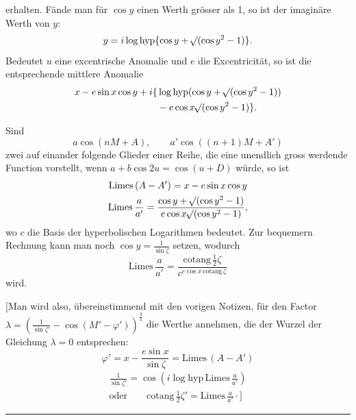 erhalten. Fände man für \(\cos y\) einen Werth grösser als 1, so ist der imaginäre
Werth von \(y\):
\[
y=i\log\mathrm{hyp}\{\cos y+\mathord{{}^{}\!\surd}(\cos y^2-1)\}.
\]
\noindent Bedeutet \(u\) eine excentrische Anomalie und \(e\) die Excentricität, so ist
die entsprechende mittlere Anomalie
\[
\begin{aligned}
x-e\sin x\cos y+i\{&\log\mathrm{hyp}(\cos y+\mathord{{}^{}\!\surd}(\cos y^2-1))\\
&-e\cos x\mathord{{}^{}\!\surd}(\cos y^2-1)\}.
\end{aligned}
\]
\par\noindent\hspace*{\parindent}Sind
\[
a\cos(nM+A),\qquad a'\cos((n+1)M+A')
\]
\noindent zwei auf einander folgende Glieder einer Reihe, die eine unendlich gross
werdende Function vorstellt, wenn \(a+b\cos2u=\cos(u+D)\) würde, so ist
\[
\begin{gathered}
\mathrm{Limes}\,(A-A')=x-e\sin x\cos y\\
\mathrm{Limes}\,\frac a{a'}=\frac{\cos y+\mathord{{}^{}\!\surd}(\cos y^2-1)}{e\cos x\mathord{{}^{}\!\surd}(\cos y^2-1)},
\end{gathered}
\]
\noindent wo \(c\) die Basis der hyperbolischen Logarithmen bedeutet. Zur bequemern
Rechnung kann man noch \(\cos y=\frac1{\sin\zeta}\) setzen, wodurch
\[
\mathrm{Limes}\,\frac a{a'}=\frac{\mathrm{cotang}\,\frac12\zeta}{c^{e\cos x\,\mathrm{cotang}\,\zeta}}
\]
\noindent wird.
\par\noindent\hspace*{\parindent}[Man wird also, übereinstimmend mit den vorigen Notizen, für den Factor
\(\lambda=\left(\frac1{\sin\zeta'}-\cos(M'-\varphi')\right)^{\frac32}\) die Werthe annehmen,
die der Wurzel der Gleichung \(\lambda=0\) entsprechen:
\[
\varphi'=x-\frac{e\sin x}{\sin\zeta}=\mathrm{Limes}\,(A-A')
\]
\[
\begin{gathered}
\frac1{\sin\zeta'}=\cos\left(i\log\mathrm{hyp}\,\mathrm{Limes}\,\frac a{a'}\right)\\
\text{oder}\qquad \mathrm{cotang}\,\tfrac12\zeta'=\mathrm{Limes}\,\frac a{a'}\mathpunct{\cdot}\Biggr]
\end{gathered}
\]
\par\medskip\begin{center}\rule{4em}{.4pt}\end{center}
\endgroup

\clearpage
\endgroup
